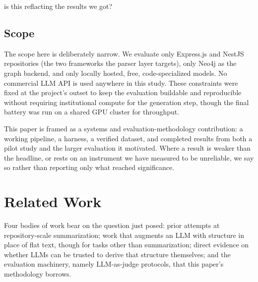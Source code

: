 is this reflacting the results we got?\documentclass[conference]{IEEEtran}
\begin{document}
\subsection{Scope}
The scope here is deliberately narrow. We evaluate only Express.js and NestJS repositories (the
two frameworks the parser layer targets), only Neo4j as the graph backend, and only locally
hosted, free, code-specialized models. No commercial LLM API is used anywhere in this study.
These constraints were fixed at the project's outset to keep the evaluation buildable and
reproducible without requiring institutional compute for the generation step, though the final
battery was run on a shared GPU cluster for throughput.

This paper is framed as a systems and evaluation-methodology contribution: a working pipeline,
a harness, a verified dataset, and completed results from both a pilot study and the larger
evaluation it motivated. Where a result is weaker than the headline, or rests on an instrument
we have measured to be unreliable, we say so rather than reporting only what reached
significance.

\section{Related Work}
\label{sec:related}


Four bodies of work bear on the question just posed: prior attempts at repository-scale
summarization; work that augments an LLM with structure in place of flat text, though for tasks
other than summarization; direct evidence on whether LLMs can be trusted to derive that
structure themselves; and the evaluation machinery, namely LLM-as-judge protocols, that this
paper's methodology borrows.
\end{document}
